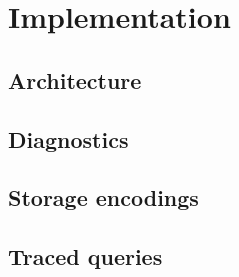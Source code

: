 
\section{Implementation}

\subsection{Architecture}

\subsection{Diagnostics}





\subsection{Storage encodings}

\subsection{Traced queries}

